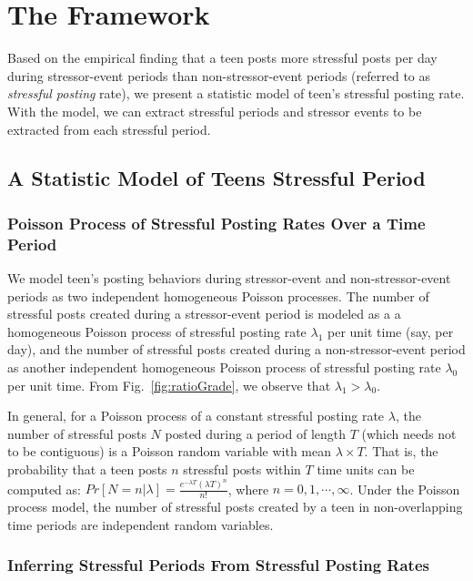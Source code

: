 \section{The Framework}

Based on the empirical finding that a teen posts more stressful posts per day
during stressor-event periods than non-stressor-event periods (referred to as \emph{stressful posting} rate),
we present a statistic model of teen's stressful posting rate.
With the model, we can extract stressful periods
and stressor events to be extracted from each stressful period.

\subsection{A Statistic Model of Teens Stressful Period}

\subsubsection{Poisson Process of Stressful Posting Rates Over a Time Period}

We model teen's posting behaviors during stressor-event and non-stressor-event periods as two independent homogeneous Poisson processes.
The number of stressful posts created during a stressor-event period is modeled as a
a homogeneous Poisson process of stressful posting rate $\lambda_1$ per unit time (say, per day), and
the number of stressful posts created during a non-stressor-event period as another
independent homogeneous Poisson process of stressful posting rate $\lambda_0$ per unit time.
From Fig.~\ref{fig:ratioGrade}, we observe that $\lambda_1 > \lambda_0$.

In general, for a Poisson process of a constant stressful posting rate $\lambda$,
the number of stressful posts $N$ posted during a period of length $T$
(which needs not to be contiguous) is a Poisson random variable with mean $\lambda \times T$.
That is, the probability that a teen posts $n$ stressful posts within $T$ time units can be computed as:
$Pr[N=n|\lambda]=\frac{e^{-\lambda T}{(\lambda T)}^n}{n!}$, where $n=0,1,\cdots,\infty$.
Under the Poisson process model, the number of stressful posts created by a teen in non-overlapping time periods are
independent random variables.

\subsubsection{Inferring Stressful Periods From Stressful Posting Rates}

